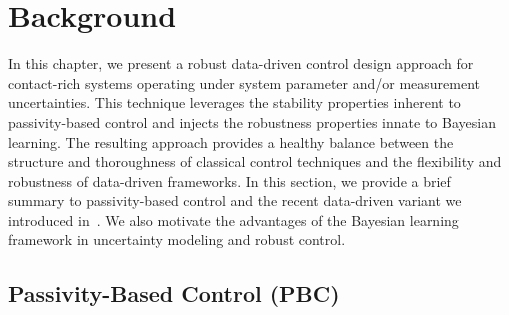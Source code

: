 \section{Background}

In this chapter, we present a robust data-driven control design approach for
contact-rich systems operating under system parameter and/or measurement
uncertainties.
%
This technique leverages the stability properties inherent to passivity-based
control and injects the robustness properties innate to Bayesian learning.
%
The resulting approach provides a healthy balance between the structure and
thoroughness of classical control techniques and the flexibility and robustness
of data-driven frameworks. 
%
In this section, we provide a brief summary to passivity-based control and the
recent data-driven variant we introduced in~\cite{ashenafi2022robust,
sirichotiyakul2022data, acc}.
%
We also motivate the advantages of the Bayesian learning framework in
uncertainty modeling and robust control.

\subsection{Passivity-Based Control (PBC)}
\label{ssec:pbc}

